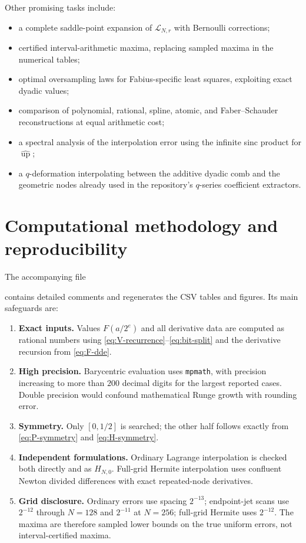 \documentclass[11pt,oneside]{article}
\theoremstyle{definition}
\theoremstyle{remark}
\newcommand{\Up}{\operatorname{up}}
\begin{document}
Other promising tasks include:
\begin{itemize}[leftmargin=2em]
\item a complete saddle-point expansion of $\mathscr L_{N,r}$ with Bernoulli corrections;
\item certified interval-arithmetic maxima, replacing sampled maxima in the numerical tables;
\item optimal oversampling laws for Fabius-specific least squares, exploiting exact dyadic values;
\item comparison of polynomial, rational, spline, atomic, and Faber--Schauder reconstructions at equal arithmetic cost;
\item a spectral analysis of the interpolation error using the infinite sinc product for $\widehat{\Up}$;
\item a $q$-deformation interpolating between the additive dyadic comb and the geometric nodes already used in the repository's $q$-series coefficient extractors.
\end{itemize}

\section{Computational methodology and reproducibility}
\label{sec:computation}

The accompanying file
\begin{center}
\end{center}
contains detailed comments and regenerates the CSV tables and figures.  Its main safeguards are:
\begin{enumerate}[leftmargin=2em]
\item \textbf{Exact inputs.}  Values $F(a/2^e)$ and all derivative data are computed as rational numbers using \eqref{eq:V-recurrence}--\eqref{eq:bit-split} and the derivative recursion from \eqref{eq:F-dde}.
\item \textbf{High precision.}  Barycentric evaluation uses \texttt{mpmath}, with precision increasing to more than $200$ decimal digits for the largest reported cases.  Double precision would confound mathematical Runge growth with rounding error.
\item \textbf{Symmetry.}  Only $[0,1/2]$ is searched; the other half follows exactly from \eqref{eq:P-symmetry} and \eqref{eq:H-symmetry}.
\item \textbf{Independent formulations.}  Ordinary Lagrange interpolation is checked both directly and as $H_{N,0}$.  Full-grid Hermite interpolation uses confluent Newton divided differences with exact repeated-node derivatives.
\item \textbf{Grid disclosure.}  Ordinary errors use spacing $2^{-13}$; endpoint-jet scans use $2^{-12}$ through $N=128$ and $2^{-11}$ at $N=256$; full-grid Hermite uses $2^{-12}$.  The maxima are therefore sampled lower bounds on the true uniform errors, not interval-certified maxima.
\end{enumerate}
\end{document}

